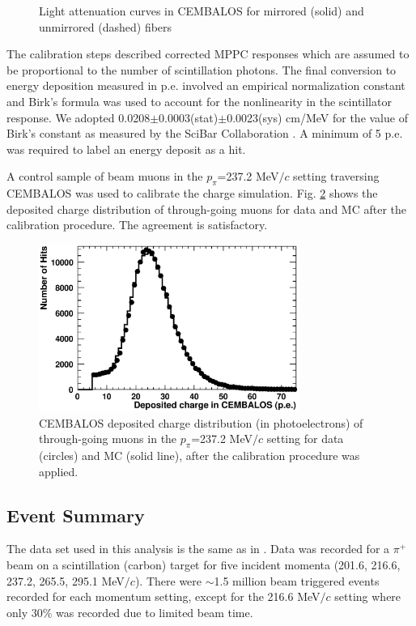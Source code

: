 \begin{enumerate}
\begin{figure}[!h]
\begin{center}
\caption{Light attenuation curves in CEMBALOS for mirrored (solid) and unmirrored (dashed) fibers}
\label{fig:attcurves}
\end{center} 
\end{figure}
\end{enumerate}

The calibration steps described corrected MPPC responses which are assumed to be proportional to the number of scintillation photons. The final conversion to energy deposition measured in p.e. involved  an empirical normalization constant and Birk's formula was used to account for the nonlinearity in the scintillator response. We adopted 0.0208$\pm$0.0003(stat)$\pm$0.0023(sys) cm/MeV for the value of Birk's constant as measured by the SciBar Collaboration \cite{scibar}. A minimum of 5 p.e. was required to label an energy deposit as a hit.

A control sample of beam muons in the $p_{\pi}$=237.2 MeV$/c$ setting traversing CEMBALOS was used to calibrate the charge simulation. Fig. \ref{fig:muoncharge} shows the deposited charge distribution of through-going muons for data and MC after the calibration procedure. The agreement is satisfactory.

\begin{figure}[!h]
\begin{center}
\includegraphics[width=85mm]{figures/muon_charge_calib.eps}
\caption{CEMBALOS deposited charge distribution (in photoelectrons) of through-going muons in the $p_{\pi}$=237.2 MeV$/c$ setting for data (circles) and MC (solid line), after the calibration procedure was applied.}
\label{fig:muoncharge}
\end{center}
\end{figure}

\subsection{Event Summary}
The data set used in this analysis is the same as in \cite{duet}. Data was recorded for a $\pi^{+}$ beam on a scintillation (carbon) target for five incident momenta (201.6, 216.6, 237.2, 265.5, 295.1 MeV$/c$). There were $\sim$1.5 million beam triggered events recorded for each momentum setting, except for the 216.6 MeV$/c$ setting where only 30\% was recorded due to limited beam time.
